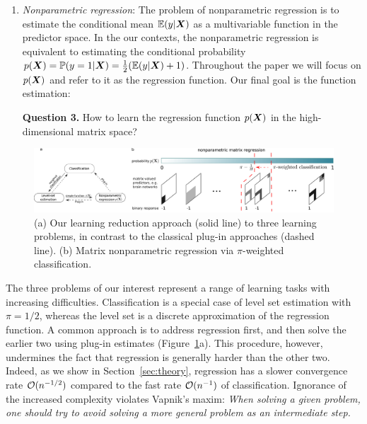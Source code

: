 \documentclass[11pt]{article}
\theoremstyle{definition}
\begin{document}
\begin{enumerate}[label={2.\arabic*},wide, labelwidth=!, labelindent=0pt]
{\bf Question 2.} How to simultaneously estimate the level set and identify important variables in the matrix-valued predictor space, for the goal of interpretable prediction?


\item {\it Nonparametric regression}: The problem of nonparametric regression is to estimate the conditional mean $\mathbb{E}(y|\bm X)$ as a multivariable function in the predictor space. In the our contexts, the nonparametric regression is equivalent to estimating the conditional probability $p(\bm X)=\mathbb{P}(y=1|\bm X)=\frac{1}{2}(\mathbb{E}(y|\bm X)+1)$. Throughout the paper we will focus on $p(\bm X)$ and refer to it as the regression function. Our final goal is the function estimation:

{\bf Question 3.} How to learn the regression function $p(\bm X)$ in the high-dimensional matrix space?
\end{enumerate}


\begin{figure}\centering
\includegraphics[width=1\textwidth]{new_demo.pdf}
\caption{(a) Our learning reduction approach (solid line) to three learning problems, in contrast to the classical plug-in approaches (dashed line). (b) Matrix nonparametric regression via $\pi$-weighted classification.}\label{fig:diagram}
\end{figure}

The three problems of our interest represent a range of learning tasks with increasing difficulties. Classification is a special case of level set estimation with $\pi=1/2$, whereas the level set is a discrete approximation of the regression function. A common approach is to address regression first, and then solve the earlier two using plug-in estimates (Figure~\ref{fig:diagram}a). This procedure, however, undermines the fact that regression is generally harder than the other two. Indeed, as we show in Section~\ref{sec:theory}, regression has a slower convergence rate $\mathcal{O}(n^{-1/2})$ compared to the fast rate $\mathcal{O}(n^{-1})$ of classification. Ignorance of the increased complexity violates Vapnik’s maxim: \emph{When solving a given problem, one should try to avoid solving a more general problem as an intermediate step.} 
\end{document}

